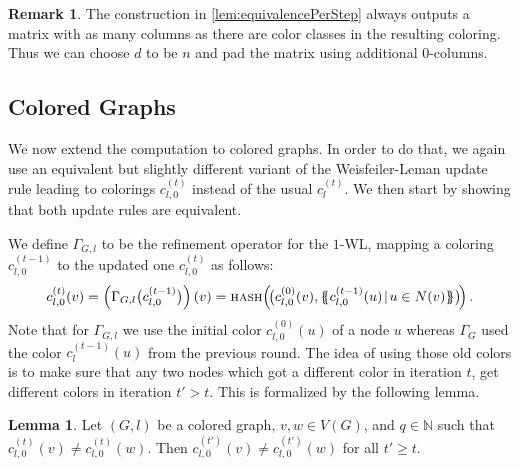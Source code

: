 \documentclass[letterpaper]{article}
\theoremstyle{definition}
\newtheorem{lemma}[theorem]{Lemma}
\newtheorem{remark}[theorem]{Remark}
\newcommand{\NN}{\mathbb{N}}
\newcommand{\oms}{\{\!\!\{}
\newcommand{\cms}{\}\!\!\}}
\begin{document}
\begin{remark}\label{rem:fixedSizeOutput}
	The construction in \cref{lem:equivalencePerStep} always outputs a matrix with as many columns as there are color classes in the resulting coloring.
	Thus we can choose $d$ to be $n$ and pad the matrix using additional $0$-columns.
\end{remark}

\subsection{Colored Graphs}
We now extend the computation to colored graphs.
In order to do that, we again use an equivalent but slightly different variant of the Weisfeiler-Leman update rule leading to colorings $c_{l,0}^{(t)}$ instead of the usual $c_{l}^{(t)}$. 
We then start by showing that both update rules are equivalent.

We define $\Gamma_{G,l}$ to be the refinement operator for the $1$-WL, mapping a coloring $c_{l,0}^{(t-1)}$ to the updated one $c_{l,0}^{(t)}$ as follows:
\begin{equation*}\label{eq:4}
	c_{l,0}^{(t)}(v) = \left(\Gamma_{G,l}\big(c_{l,0}^{(t-1)}\big)\right)(v)= \textsc{hash}\Big(\! \big(c_{l,0}^{(0)}(v),\oms c_{l,0}^{(t-1)}(u)\!\mid\!u \in N(v) \cms \big)\! \Big)\,.
\end{equation*}
Note that for $\Gamma_{G,l}$ we use the initial color $c_{l,0}^{(0)}(u)$ of a node $u$ whereas $\Gamma_G$ used the color $c_l^{(t-1)}(u)$ from the previous round.
The idea of using those old colors is to make sure that any two nodes which got a different color in iteration $t$, get different colors in iteration $t'>t$.
This is formalized by the following lemma.

\begin{lemma}\label{lem:2}
	Let $(G,l)$ be a colored graph, $v,w\in V(G)$, and $q\in\NN$ such that
	$c_{l,0}^{(t)}(v)\neq c^{(t)}_{l,0}(w)$. 
	Then $c^{(t')}_{l,0}(v)\neq c^{(t')}_{l,0}(w)$ for all $t'\geq t$.
\end{lemma}
\end{document}

